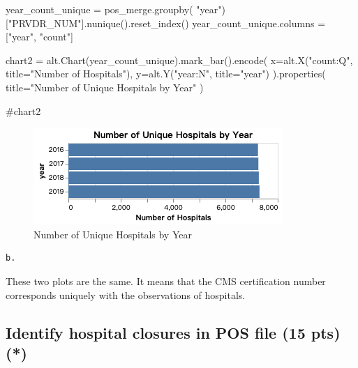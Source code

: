 \documentclass[
  letterpaper,
  DIV=11,
  numbers=noendperiod]{scrartcl}
\newenvironment{Shaded}{\begin{snugshade}}{\end{snugshade}}
\newcommand{\CommentTok}[1]{\textcolor[rgb]{0.37,0.37,0.37}{#1}}
\newcommand{\NormalTok}[1]{\textcolor[rgb]{0.00,0.23,0.31}{#1}}
\newcommand{\OperatorTok}[1]{\textcolor[rgb]{0.37,0.37,0.37}{#1}}
\newcommand{\StringTok}[1]{\textcolor[rgb]{0.13,0.47,0.30}{#1}}
\begin{document}
\begin{Shaded}
\begin{Highlighting}[]
\NormalTok{year\_count\_unique }\OperatorTok{=}\NormalTok{ pos\_merge.groupby(}
    \StringTok{"year"}\NormalTok{)[}\StringTok{"PRVDR\_NUM"}\NormalTok{].nunique().reset\_index()}
\NormalTok{year\_count\_unique.columns }\OperatorTok{=}\NormalTok{ [}\StringTok{"year"}\NormalTok{, }\StringTok{"count"}\NormalTok{]}

\NormalTok{chart2 }\OperatorTok{=}\NormalTok{ alt.Chart(year\_count\_unique).mark\_bar().encode(}
\NormalTok{    x}\OperatorTok{=}\NormalTok{alt.X(}\StringTok{"count:Q"}\NormalTok{, title}\OperatorTok{=}\StringTok{"Number of Hospitals"}\NormalTok{),}
\NormalTok{    y}\OperatorTok{=}\NormalTok{alt.Y(}\StringTok{"year:N"}\NormalTok{, title}\OperatorTok{=}\StringTok{"year"}\NormalTok{)}
\NormalTok{).properties(}
\NormalTok{    title}\OperatorTok{=}\StringTok{"Number of Unique Hospitals by Year"}
\NormalTok{)}

\CommentTok{\#chart2}
\end{Highlighting}
\end{Shaded}

\begin{figure}[H]

{\centering \includegraphics{chart2.png}

}

\caption{Number of Unique Hospitals by Year}

\end{figure}%

\begin{verbatim}
b.
\end{verbatim}

These two plots are the same. It means that the CMS certification number
corresponds uniquely with the observations of hospitals.

\subsection{Identify hospital closures in POS file (15 pts)
(*)}\label{identify-hospital-closures-in-pos-file-15-pts}
\end{document}
